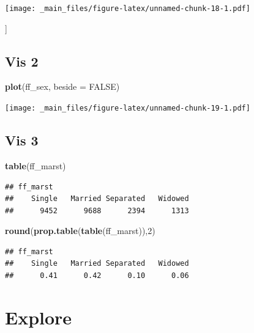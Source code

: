 \documentclass[
]{book}
\newenvironment{Shaded}{\begin{snugshade}}{\end{snugshade}}
\newcommand{\AttributeTok}[1]{\textcolor[rgb]{0.13,0.29,0.53}{#1}}
\newcommand{\ConstantTok}[1]{\textcolor[rgb]{0.56,0.35,0.01}{#1}}
\newcommand{\DecValTok}[1]{\textcolor[rgb]{0.00,0.00,0.81}{#1}}
\newcommand{\FunctionTok}[1]{\textcolor[rgb]{0.13,0.29,0.53}{\textbf{#1}}}
\newcommand{\NormalTok}[1]{#1}
\begin{document}
\texttt{[image: \_main\_files/figure-latex/unnamed-chunk-18-1.pdf]}

{]}

\hypertarget{vis-2}{%
\subsection{Vis 2}\label{vis-2}}

\begin{Shaded}
\begin{Highlighting}[]
\FunctionTok{plot}\NormalTok{(ff\_sex, }\AttributeTok{beside =} \ConstantTok{FALSE}\NormalTok{)}
\end{Highlighting}
\end{Shaded}

\texttt{[image: \_main\_files/figure-latex/unnamed-chunk-19-1.pdf]}

\hypertarget{vis-3}{%
\subsection{Vis 3}\label{vis-3}}

\begin{Shaded}
\begin{Highlighting}[]
\FunctionTok{table}\NormalTok{(ff\_marst)}
\end{Highlighting}
\end{Shaded}

\begin{verbatim}
## ff_marst
##    Single   Married Separated   Widowed 
##      9452      9688      2394      1313
\end{verbatim}

\begin{Shaded}
\begin{Highlighting}[]
\FunctionTok{round}\NormalTok{(}\FunctionTok{prop.table}\NormalTok{(}\FunctionTok{table}\NormalTok{(ff\_marst)),}\DecValTok{2}\NormalTok{)}
\end{Highlighting}
\end{Shaded}

\begin{verbatim}
## ff_marst
##    Single   Married Separated   Widowed 
##      0.41      0.42      0.10      0.06
\end{verbatim}

\hypertarget{explore-1}{%
\section{Explore}\label{explore-1}}
\end{document}

